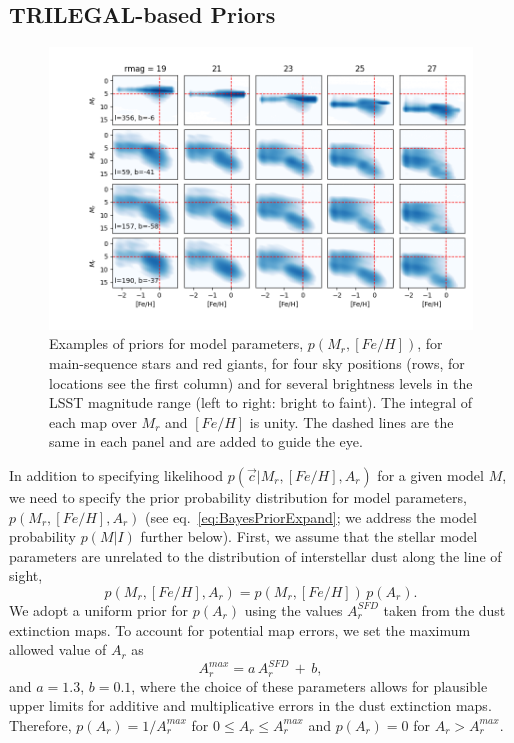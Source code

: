 \subsection{TRILEGAL-based Priors} 

\begin{figure}[t!]
\hskip -0.5in
\includegraphics[width=1.07\textwidth,angle=0]{figures/Stripe82priorMosaic.png}
\vskip -0.4in  
\caption{Examples of priors for model parameters, $p(M_r, [Fe/H])$, for main-sequence stars and red giants,
  for four sky positions (rows, for locations see the first column) and for several brightness levels in the LSST
  magnitude range (left to right: bright to faint). The integral of each map over $M_r$ and $[Fe/H]$ is unity. 
  The dashed lines are the same in each panel and are added to guide the eye. 
}
\label{fig:priorsAstroLab}
\end{figure}


In addition to specifying likelihood $p(\vec{c}|M_r, [Fe/H], A_r)$ for a given model $M$, we need to specify
the prior probability distribution for model parameters, $p(M_r, [Fe/H],A_r)$ (see eq.~\ref{eq:BayesPriorExpand};
we address the model probability $p(M|I)$ further below). First, we assume that the stellar model parameters
are unrelated to the distribution of interstellar dust along the line of sight,
\begin{equation}
 \label{eq:BayesPrior2}
               p(M_r, [Fe/H],A_r) = p(M_r, [Fe/H]) \, p(A_r).
\end{equation}
We adopt a uniform prior for $p(A_r)$ using the values $A_r^{SFD}$ taken from the \cite{schlegel_maps_1998}
dust extinction maps. To account for potential map errors, we set the maximum allowed value of $A_r$ as
\begin{equation}
          A_r^{max} =  a \, A_r^{SFD} \, + \, b,
\end{equation}
and $a=1.3$, $b=0.1$, where the choice of these parameters allows for plausible upper limits for additive and
multiplicative errors in the dust extinction maps. Therefore, $p(A_r) = 1/A_r^{max}$ for $0 \le A_r \le A_r^{max}$
and $p(A_r) = 0$ for $A_r > A_r^{max}$.  

